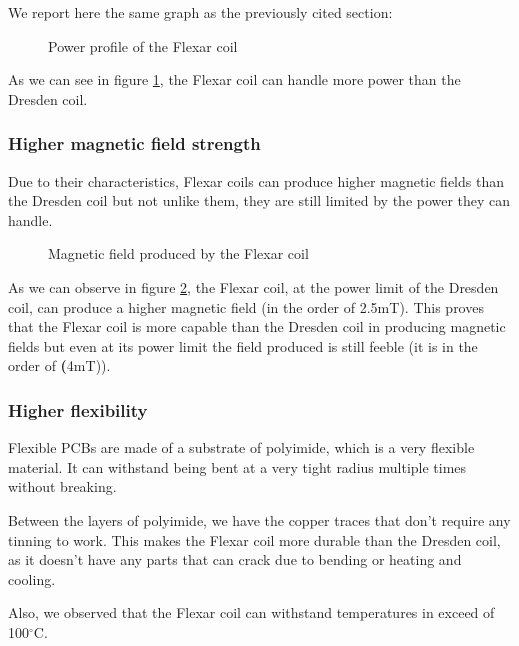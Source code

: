 We report here the same graph as the previously cited section:
\begin{figure}
    \centering
    \resizebox{0.5\textwidth}{!}{}
    \caption{Power profile of the Flexar coil}
    \label{fig: Flexar_heat_graph}
\end{figure}

As we can see in figure \ref{fig: Flexar_heat_graph}, the Flexar coil can handle more power than the Dresden coil.

\subsubsection{Higher magnetic field strength}
Due to their characteristics, Flexar coils can produce higher magnetic fields than the Dresden coil but not unlike them, they are still limited by the power they can handle.
\begin{figure}
    \centering
    \resizebox{0.5\textwidth}{!}{}
    \caption{Magnetic field produced by the Flexar coil}
    \label{fig: Flexar_magnetic_field_vs_P}
\end{figure}
As we can observe in figure \ref{fig: Flexar_magnetic_field_vs_P}, the Flexar coil, at the power limit of the Dresden coil, can produce a higher magnetic field (in the order of 2.5mT).
This proves that the Flexar coil is more capable than the Dresden coil in producing magnetic fields but even at its power limit the field produced is still feeble (it is in the order of \textbf(4mT)).

\subsubsection{Higher flexibility}
Flexible PCBs are made of a substrate of polyimide, which is a very flexible material.
It can withstand being bent at a very tight radius multiple times without breaking.

Between the layers of polyimide, we have the copper traces that don't require any tinning to work.
This makes the Flexar coil more durable than the Dresden coil, as it doesn't have any parts that can crack due to bending or heating and cooling.

Also, we observed that the Flexar coil can withstand temperatures in exceed of 100$^{\circ}$C.

